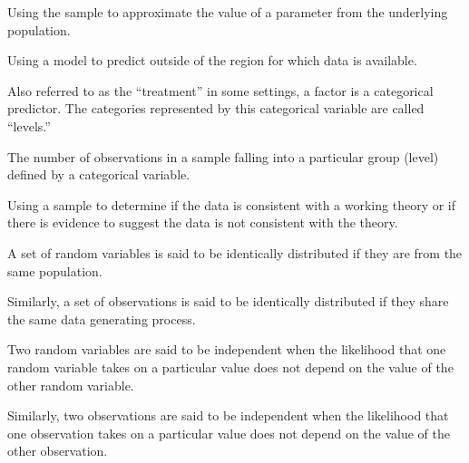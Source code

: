 \documentclass[
  letterpaper,
  DIV=11,
  numbers=noendperiod]{scrreprt}
\providecommand{\tightlist}{%
  \setlength{\itemsep}{0pt}\setlength{\parskip}{0pt}}\usepackage{longtable,booktabs,array}
\theoremstyle{definition}
\theoremstyle{definition}
\theoremstyle{plain}
\theoremstyle{remark}
\begin{document}
\begin{description}
\tightlist
\item[Estimation (Definition~\ref{def-estimation})]
Using the sample to approximate the value of a parameter from the
underlying population.
\item[Extrapolation (Definition~\ref{def-extrapolation})]
Using a model to predict outside of the region for which data is
available.
\item[Factor (Definition~\ref{def-factor})]
Also referred to as the ``treatment'' in some settings, a factor is a
categorical predictor. The categories represented by this categorical
variable are called ``levels.''
\item[Frequency (Definition~\ref{def-frequency})]
The number of observations in a sample falling into a particular group
(level) defined by a categorical variable.
\item[Hypothesis Testing (Definition~\ref{def-hypothesis-testing})]
Using a sample to determine if the data is consistent with a working
theory or if there is evidence to suggest the data is not consistent
with the theory.
\item[Identically Distributed
(Definition~\ref{def-identically-distributed})]
A set of random variables is said to be identically distributed if they
are from the same population.
\end{description}

Similarly, a set of observations is said to be identically distributed
if they share the same data generating process.

\begin{description}
\tightlist
\item[Independence (Definition~\ref{def-independence})]
Two random variables are said to be independent when the likelihood that
one random variable takes on a particular value does not depend on the
value of the other random variable.
\end{description}

Similarly, two observations are said to be independent when the
likelihood that one observation takes on a particular value does not
depend on the value of the other observation.
\end{document}
